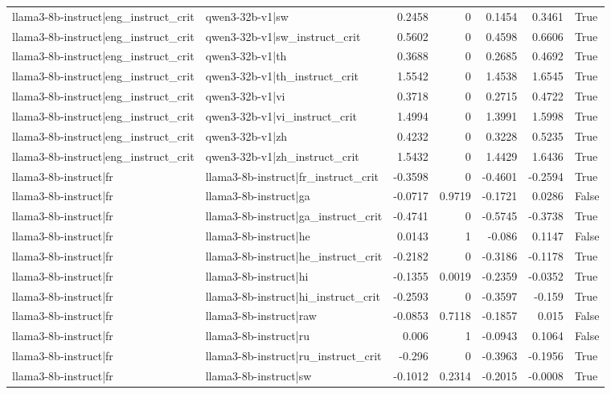 \begin{table}
\begin{tabular}{l l r r r r l}
llama3-8b-instruct|eng_instruct_crit & qwen3-32b-v1|sw & 0.2458 & 0 & 0.1454 & 0.3461 & True \\
llama3-8b-instruct|eng_instruct_crit & qwen3-32b-v1|sw_instruct_crit & 0.5602 & 0 & 0.4598 & 0.6606 & True \\
llama3-8b-instruct|eng_instruct_crit & qwen3-32b-v1|th & 0.3688 & 0 & 0.2685 & 0.4692 & True \\
llama3-8b-instruct|eng_instruct_crit & qwen3-32b-v1|th_instruct_crit & 1.5542 & 0 & 1.4538 & 1.6545 & True \\
llama3-8b-instruct|eng_instruct_crit & qwen3-32b-v1|vi & 0.3718 & 0 & 0.2715 & 0.4722 & True \\
llama3-8b-instruct|eng_instruct_crit & qwen3-32b-v1|vi_instruct_crit & 1.4994 & 0 & 1.3991 & 1.5998 & True \\
llama3-8b-instruct|eng_instruct_crit & qwen3-32b-v1|zh & 0.4232 & 0 & 0.3228 & 0.5235 & True \\
llama3-8b-instruct|eng_instruct_crit & qwen3-32b-v1|zh_instruct_crit & 1.5432 & 0 & 1.4429 & 1.6436 & True \\
llama3-8b-instruct|fr & llama3-8b-instruct|fr_instruct_crit & -0.3598 & 0 & -0.4601 & -0.2594 & True \\
llama3-8b-instruct|fr & llama3-8b-instruct|ga & -0.0717 & 0.9719 & -0.1721 & 0.0286 & False \\
llama3-8b-instruct|fr & llama3-8b-instruct|ga_instruct_crit & -0.4741 & 0 & -0.5745 & -0.3738 & True \\
llama3-8b-instruct|fr & llama3-8b-instruct|he & 0.0143 & 1 & -0.086 & 0.1147 & False \\
llama3-8b-instruct|fr & llama3-8b-instruct|he_instruct_crit & -0.2182 & 0 & -0.3186 & -0.1178 & True \\
llama3-8b-instruct|fr & llama3-8b-instruct|hi & -0.1355 & 0.0019 & -0.2359 & -0.0352 & True \\
llama3-8b-instruct|fr & llama3-8b-instruct|hi_instruct_crit & -0.2593 & 0 & -0.3597 & -0.159 & True \\
llama3-8b-instruct|fr & llama3-8b-instruct|raw & -0.0853 & 0.7118 & -0.1857 & 0.015 & False \\
llama3-8b-instruct|fr & llama3-8b-instruct|ru & 0.006 & 1 & -0.0943 & 0.1064 & False \\
llama3-8b-instruct|fr & llama3-8b-instruct|ru_instruct_crit & -0.296 & 0 & -0.3963 & -0.1956 & True \\
llama3-8b-instruct|fr & llama3-8b-instruct|sw & -0.1012 & 0.2314 & -0.2015 & -0.0008 & True \\

\end{tabular}
\end{table}
